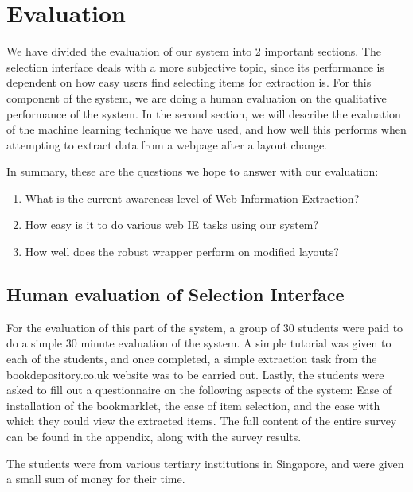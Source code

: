\chapter{Evaluation}
\label{chap:evaluation}
We have divided the evaluation of our system into 2 important sections. The selection interface
deals with a more subjective topic, since its performance is dependent on how easy users find 
selecting items for extraction is. For this component of the system, we are doing a human
evaluation on the qualitative performance of the system. In the second section, we will describe
the evaluation of the machine learning technique we have used, and how well this performs when
attempting to extract data from a webpage after a layout change.

In summary, these are the questions we hope to answer with our evaluation:
\begin{enumerate}
	\item What is the current awareness level of Web Information Extraction?
	\item How easy is it to do various web IE tasks using our system?
	\item How well does the robust wrapper perform on modified layouts?
\end{enumerate}



\section{Human evaluation of Selection Interface}

For the evaluation of this part of the system, a group of 30 students were paid to do a simple 30
minute evaluation of the system. A simple tutorial was given to each of the students, and once
completed, a simple extraction task from the bookdepository.co.uk website was to be carried out.
Lastly, the students were asked to fill out a questionnaire on the following aspects of the
system: Ease of installation of the bookmarklet, the ease of item selection, and the ease with
which they could view the extracted items. The full content of the entire survey can be found in
the appendix, along with the survey results.

The students were from various tertiary institutions in Singapore, and were given a small sum of
money for their time.



